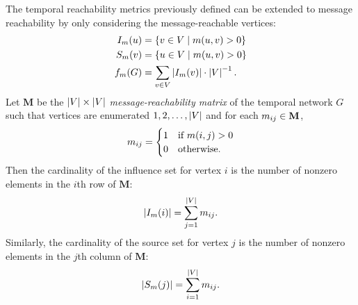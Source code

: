 The temporal reachability metrics previously defined can be extended to message reachability by only considering the message-reachable vertices:
%
\begin{align*}
	I_m(u) &= \{v \in V \mid m(u, v) > 0\} \\
	S_m(v) &= \{u \in V \mid m(u, v) > 0\} \\
	f_m(G) &= \sum_{v \in V} \left\vert I_m(v) \right\vert \cdot \left\vert V \right\vert^{-1}.
\end{align*}
%
Let $\mathbf{M}$ be the $\left\vert V \right\vert \times \left\vert V \right\vert$ \emph{message-reachability matrix} of the temporal network $G$ such that vertices are enumerated $1, 2, \ldots, \left\vert V \right\vert$ and for each $m_{ij} \in \mathbf{M}$,
%
\begin{equation*}
	m_{ij} = 
	   \begin{cases}
        	1 & \text{if } m(i, j) > 0 \\
        	0 & \text{otherwise.}
	   \end{cases}
\end{equation*}
%
Then the cardinality of the influence set for vertex $i$ is the number of nonzero elements in the $i$th row of $\mathbf{M}$:
%
\begin{equation}\label{eq:influence-size}
	\left\vert I_m(i) \right\vert = \sum_{j=1}^{\left\vert V \right\vert} m_{ij} .
\end{equation}
%
Similarly, the cardinality of the source set for vertex $j$ is the number of nonzero elements in the $j$th column of $\mathbf{M}$:
%
\begin{equation}\label{eq:source-size}
	\left\vert S_m(j) \right\vert = \sum_{i=1}^{\left\vert V \right\vert} m_{ij} .
\end{equation}


